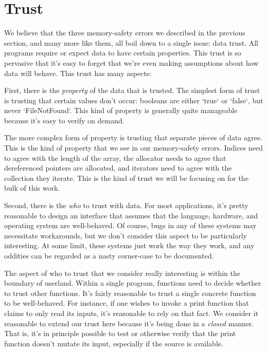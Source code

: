 \chapter{Trust}
\label{ch:trust}

We believe that the three memory-safety errors we described in the previous
section, and many more like them, all boil down to a single issue: data trust.
All programs require or expect data to have certain properties. This trust
is so pervasive that it's easy to forget that we're even making assumptions about
how data will behave. This trust has many aspects:




First, there is the \emph{property} of the data that is trusted. The simplest form of
trust is trusting that certain values don't occur: booleans are either `true`
or `false`, but never `FileNotFound`. This kind of property is generally quite
manageable because it's easy to verify on demand.

The more complex form of property is trusting that separate pieces of data agree.
This is the kind of property that we see in our memory-safety errors. Indices need
to agree with the length of the array, the allocator needs to agree that
dereferenced pointers are allocated, and iterators need to agree with the collection
they iterate. This is the kind of trust we will be focusing on for the bulk of
this work.




Second, there is the \emph{who} to trust with data. For most applications, it's pretty
reasonable to design an interface that assumes that the language, hardware, and
operating system are well-behaved. Of course, bugs in any of these systems
may necessitate workarounds, but we don't consider this aspect to be particularly
interesting. At some limit, these systems just work the way they work, and any
oddities can be regarded as a nasty corner-case to be documented.

The aspect of who to trust that we consider really interesting is within the
boundary of userland. Within a single program, functions need to decide whether
to trust other functions. It's fairly reasonable to trust a single concrete
function to be well-behaved. For instance, if one wishes to invoke a print
function that claims to only read its inputs, it's reasonable to rely on that
fact. We consider it reasonable to extend our trust here because it's being done
in a \emph{closed} manner. That is, it's in principle possible to test or otherwise
verify that the print function doesn't mutate its input, especially if the
source is available.

